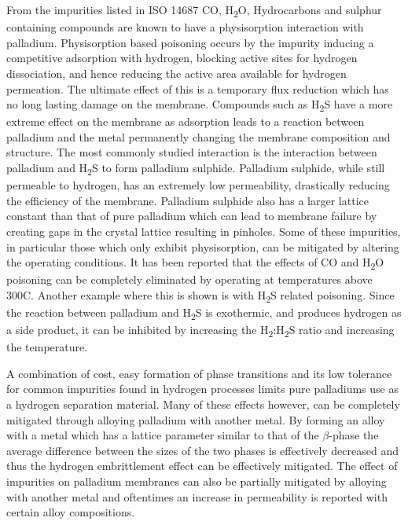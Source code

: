 From the impurities listed in ISO 14687 CO, H\textsubscript{2}O, Hydrocarbons and sulphur 
containing compounds are known to have a physisorption interaction with palladium. 
Physisorption based poisoning occurs by the impurity inducing a competitive adsorption 
with hydrogen, blocking active sites for hydrogen dissociation, and hence reducing the 
active area available for hydrogen permeation.\cite{Gao2004} The ultimate effect of this is a temporary 
flux reduction which has no long lasting damage on the membrane. Compounds such as 
H\textsubscript{2}S have a more extreme effect on the membrane as 
adsorption leads to a reaction between palladium and the metal permanently changing the 
membrane composition and structure. The most commonly studied interaction is the interaction 
between palladium and H\textsubscript{2}S to form palladium sulphide. Palladium sulphide, while still
permeable to hydrogen, has an extremely low permeability, drastically reducing the efficiency 
of the membrane. Palladium sulphide also has a larger lattice constant than that of pure 
palladium which can lead to membrane failure by creating gaps in the crystal lattice 
resulting in pinholes. Some of these impurities, in particular those which only exhibit 
physisorption, can be mitigated by altering the operating conditions. It has been reported 
that the effects of CO and H\textsubscript{2}O poisoning can be completely eliminated by operating at 
temperatures above 300\textdegree C. Another example where this is shown is with H\textsubscript{2}S related poisoning. 
Since the reaction between palladium and H\textsubscript{2}S is exothermic, and produces hydrogen as a side 
product, it can be inhibited by increasing the H\textsubscript{2}:H\textsubscript{2}S ratio and increasing the temperature.  

A combination of cost, easy formation of phase transitions \cite{Flanagan1991, Li2008b} and its low tolerance for 
common impurities found in hydrogen processes limits pure palladiums use as a hydrogen 
separation material. Many of these effects however, can be completely mitigated through 
alloying palladium with another metal. By forming an alloy with a metal which has a lattice 
parameter similar to that of the $\beta$-phase the average difference between the sizes of 
the two phases is effectively decreased and thus the hydrogen embrittlement effect can be 
effectively mitigated. The effect of impurities on palladium membranes can also be partially 
mitigated by alloying with another metal and oftentimes an increase in permeability is 
reported with certain alloy compositions. 

